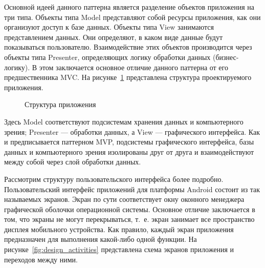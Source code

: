 Основной идеей данного паттерна является разделение объектов приложения на три типа.
Объекты типа Model представляют собой ресурсы приложения, как они организуют доступ
к базе данных. Объекты типа View занимаются представлением данных. Они определяют,
в каком виде данные будут показываться пользователю. Взаимодействие этих объектов
производится через объекты типа Presenter, определяющих логику
обработки данных (бизнес-логику). В этом заключается основное отличие данного паттерна
от его предшественника MVC.
На рисунке~\ref{fig:design_main} представлена структура проектируемого приложения.

\begin{figure}[h!]
  \centering
  \caption{Структура приложения}
  \label{fig:design_main}
\end{figure}

Здесь Model соответствуют подсистемам хранения данных и компьютерного зрения;
Presenter --- обработки данных, а View --- графического интерфейса.
Как и предписывается паттерном MVP, подсистемы графического интерфейса,
базы данных и компьютерного зрения изолированы друг от друга и взаимодействуют
между собой через слой обработки данных.

Рассмотрим структуру пользовательского интерфейса более подробно.
Пользовательский интерфейс приложений для платформы Android состоит
из так называемых экранов.
Экран по сути соответствует окну оконного менеджера графической оболочки
операционной системы. Основное отличие заключается в том, что
экраны не могут перекрываться, т.~е. экран занимает все пространство дисплея
мобильного устройства.
Как правило, каждый экран приложения предназначен
для выполнения какой-либо одной функции.
На рисунке~\ref{fig:design_activities} представлена схема экранов приложения
и переходов между ними.

